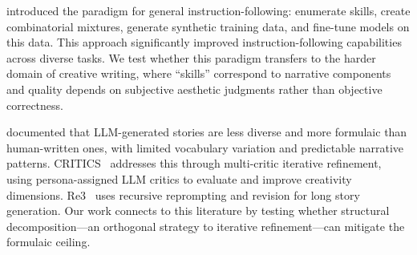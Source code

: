 \citet{allenzhu2024instructskillmix} introduced the \skillmix paradigm for general instruction-following: enumerate skills, create combinatorial mixtures, generate synthetic training data, and fine-tune models on this data.
This approach significantly improved instruction-following capabilities across diverse tasks.
We test whether this paradigm transfers to the harder domain of creative writing, where ``skills'' correspond to narrative components and quality depends on subjective aesthetic judgments rather than objective correctness.

\citet{chakrabarty2023art} documented that LLM-generated stories are less diverse and more formulaic than human-written ones, with limited vocabulary variation and predictable narrative patterns.
CRITICS~\cite{bae2024critics} addresses this through multi-critic iterative refinement, using persona-assigned LLM critics to evaluate and improve creativity dimensions.
Re3~\cite{yang2022re3} uses recursive reprompting and revision for long story generation.
Our work connects to this literature by testing whether structural decomposition---an orthogonal strategy to iterative refinement---can mitigate the formulaic ceiling.
